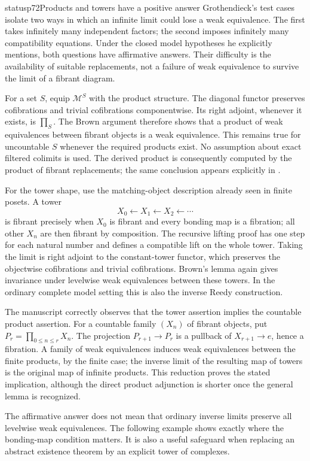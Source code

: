 \begin{dcomment}{status}{p72}{Products and towers have a positive answer}
Grothendieck's test cases isolate two ways in which an infinite limit could lose a weak equivalence. The first takes infinitely many independent factors; the second imposes infinitely many compatibility equations. Under the closed model hypotheses he explicitly mentions, both questions have affirmative answers. Their difficulty is the availability of suitable replacements, not a failure of weak equivalence to survive the limit of a fibrant diagram.

For a set $S$, equip $\mathcal M^S$ with the product structure. The diagonal functor preserves cofibrations and trivial cofibrations componentwise. Its right adjoint, whenever it exists, is $\prod_S$. The Brown argument therefore shows that a product of weak equivalences between fibrant objects is a weak equivalence. This remains true for uncountable $S$ whenever the required products exist. No assumption about exact filtered colimits is used. The derived product is consequently computed by the product of fibrant replacements; the same conclusion appears explicitly in \citet[Example 1.3.11]{Hovey1999}.

For the tower shape, use the matching-object description already seen in finite posets. A tower
\[
                         X_0\longleftarrow X_1\longleftarrow X_2\longleftarrow\cdots
\]
is fibrant precisely when $X_0$ is fibrant and every bonding map is a fibration; all other $X_n$ are then fibrant by composition. The recursive lifting proof has one step for each natural number and defines a compatible lift on the whole tower. Taking the limit is right adjoint to the constant-tower functor, which preserves the objectwise cofibrations and trivial cofibrations. Brown's lemma again gives invariance under levelwise weak equivalences between these towers. In the ordinary complete model setting this is also the inverse Reedy construction.

The manuscript correctly observes that the tower assertion implies the countable product assertion. For a countable family $(X_n)$ of fibrant objects, put $P_r=\prod_{0\leq n\leq r}X_n$. The projection $P_{r+1}\to P_r$ is a pullback of $X_{r+1}\to e$, hence a fibration. A family of weak equivalences induces weak equivalences between the finite products, by the finite case; the inverse limit of the resulting map of towers is the original map of infinite products. This reduction proves the stated implication, although the direct product adjunction is shorter once the general lemma is recognized.

The affirmative answer does not mean that ordinary inverse limits preserve all levelwise weak equivalences. The following example shows exactly where the bonding-map condition matters. It is also a useful safeguard when replacing an abstract existence theorem by an explicit tower of complexes.
\end{dcomment}

